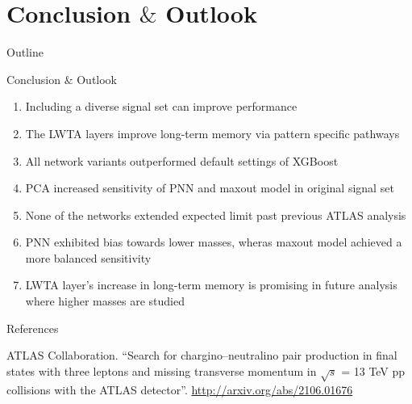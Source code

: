 \documentclass[UKenglish]{beamer}
\begin{document}
\section{Conclusion $\&$ Outlook}
\begin{frame}{Outline}
    \tableofcontents[currentsection]
\end{frame}
\begin{frame}{Conclusion $\&$ Outlook}
    \begin{enumerate}
        \item Including a diverse signal set can improve performance
        \item The LWTA layers improve long-term memory via pattern specific pathways
        \item All network variants outperformed default settings of XGBoost
        \item PCA increased sensitivity of PNN and maxout model in original signal set
        \item None of the networks extended expected limit past previous ATLAS analysis
        \item PNN exhibited bias towards lower masses, wheras maxout model achieved a more balanced 
              sensitivity
        \item LWTA layer's increase in long-term memory is promising in future analysis 
              where higher masses are studied 
    \end{enumerate}
\end{frame}





\begin{frame}[allowframebreaks]{References}
    \begin{thebibliography}{}

        ATLAS Collaboration.
        \newblock \enquote{Search for chargino--neutralino pair production in final states with three leptons and missing transverse momentum in {$\sqrt{s}$} = 13 {TeV} pp collisions with the {ATLAS} detector}.
        \newblock \url{http://arxiv.org/abs/2106.01676}


    \end{thebibliography}
\end{frame}
\end{document}
